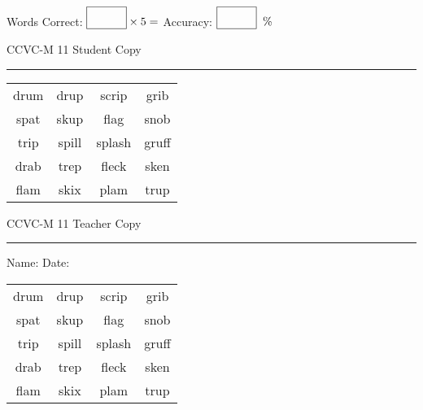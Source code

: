 \documentclass{memoir}
\begin{document}
\small

Words Correct: $\fbox{\phantom{\huge 100}} \times 5 = $ Accuracy: $\fbox{\phantom{\huge 100}}\;\; \%$ 

\vfill

\newpage


\footnotesize \noindent
CCVC-M 11 \hfill Student Copy
\smallskip
\hrule

\Large

\setlength{\tabcolsep}{14pt}
\def\arraystretch{3}

{\selectfont


\begin{vplace}[0.5]
\begin{center}
\begin{tabular}{cccc}
drum & drup & scrip & grib     \\
spat            & skup & flag             & snob \\
trip & spill & splash & gruff \\
drab             & trep & fleck             & sken \\
flam             & skix & plam & trup       \\
\end{tabular}
\end{center}
\end{vplace}

}

\newpage

\footnotesize \noindent
CCVC-M 11 \hfill Teacher Copy
\smallskip
\hrule

\small

\vfill

\noindent
Name: \underline{\hspace{1.75in}} \hfill Date: \underline{\hspace{1in}}

\Large

{\selectfont


\begin{vplace}[0.5]
\begin{center}
\begin{tabular}{cccc}
drum & drup & scrip & grib     \\
spat            & skup & flag             & snob \\
trip & spill & splash & gruff \\
drab             & trep & fleck             & sken \\
flam             & skix & plam & trup       \\
\end{tabular}
\end{center}
\end{vplace}



}
\end{document}
